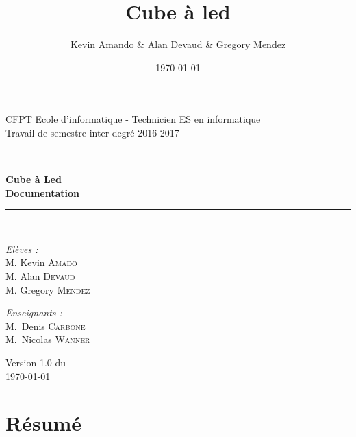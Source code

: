 \documentclass[a4paper,12pt]{article}
\title{Cube à led}
\author{Kevin Amando \& Alan Devaud \& Gregory Mendez}
\date{\today}
\begin{document}
\begin{titlepage}
    \begin{center}
        {\large CFPT Ecole d'informatique - Technicien ES en informatique}\\[0.5cm]
        {\large Travail de semestre inter-degré 2016-2017}\\[0.5cm]
        
        \rule{\linewidth}{0.5mm} \\[0.4cm]
        { \huge \bfseries Cube à Led \\ Documentation \\[0.4cm] }
        \rule{\linewidth}{0.5mm} \\[1.5cm]
    
        \noindent
        \begin{minipage}{0.4\textwidth}
          \begin{flushleft} \large
            \emph{Elèves :}\\
            M. Kevin \textsc{Amado} \\
            M. Alan \textsc{Devaud}\\
            M. Gregory \textsc{Mendez}
          \end{flushleft}
        \end{minipage}%
        \begin{minipage}{0.4\textwidth}
          \begin{flushright} \large
            \emph{Enseignants :} \\
            M.~Denis \textsc{Carbone}\\
            M.~Nicolas \textsc{Wanner}
          \end{flushright}
        \end{minipage}
        
        \vfill

        {\large Version 1.0 du\\ \today}
    \end{center}
\end{titlepage}

\newpage

\section{Résumé}
\newpage
\end{document}
